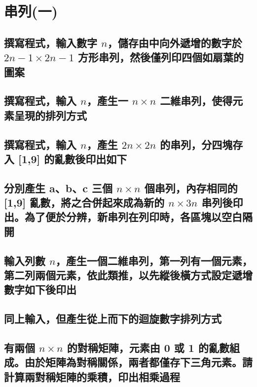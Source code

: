 \chapter{串列(一)}

\section{撰寫程式，輸入數字 $n$，儲存由中向外遞增的數字於 $2n-1\times 2n-1$ 方形串列，然後僅列印四個如扇葉的圖案}


\section{撰寫程式，輸入 $n$，產生一 $n\times n$ 二維串列，使得元素呈現的排列方式}


\section{撰寫程式，輸入 $n$，產生 $2n\times 2n$ 的串列，分四塊存入 [1,9] 的亂數後印出如下}


\section{分別產生 a、b、c 三個 $n \times n$ 個串列，內存相同的 [1,9] 亂數，將之合併起來成為新的 $n\times 3n$ 串列後印出。為了便於分辨，新串列在列印時，各區塊以空白隔開}


\section{輸入列數 $n$，產生一個二維串列，第一列有一個元素，第二列兩個元素，依此類推，以先縱後橫方式設定遞增數字如下後印出}


\section{同上輸入，但產生從上而下的迴旋數字排列方式}


\section{有兩個 $n\times n$ 的對稱矩陣，元素由 0 或 1 的亂數組成。由於矩陣為對稱關係，兩者都僅存下三角元素。請計算兩對稱矩陣的乘積，印出相乘過程}


